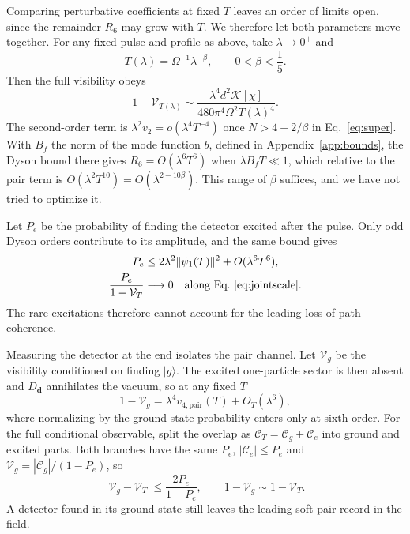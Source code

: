 \documentclass[11pt,a4paper]{article}
\newcommand{\ket}[1]{\lvert #1\rangle}
\newcommand{\cV}{\mathcal{V}}
\newcommand{\cC}{\mathcal{C}}
\newcommand{\cK}{\mathcal{K}}
\begin{document}
Comparing perturbative coefficients at fixed $T$ leaves an order of limits open, since the remainder $R_6$ may grow with $T$. We therefore let both parameters move together. For any fixed pulse and profile as above, take $\lambda\to0^+$ and
\begin{equation}
 T(\lambda)=\Omega^{-1}\lambda^{-\beta},
 \qquad 0<\beta<\frac15.\label{eq:jointscale}
\end{equation}
Then the full visibility obeys
\begin{equation}
 \boxed{\displaystyle
 1-\cV_{T(\lambda)}\sim
 \frac{\lambda^4d^2\cK[\chi]}{480\pi^4\Omega^2T(\lambda)^4}.}
 \label{eq:joint}
\end{equation}
The second-order term is $\lambda^2v_2=o(\lambda^4T^{-4})$ once $N>4+2/\beta$ in Eq.~\eqref{eq:super}. With $B_f$ the norm of the mode function $b$, defined in Appendix~\ref{app:bounds}, the Dyson bound there gives $R_6=O(\lambda^6T^6)$ when $\lambda B_fT\ll1$, which relative to the pair term is $O(\lambda^2T^{10})=O(\lambda^{2-10\beta})$. This range of $\beta$ suffices, and we have not tried to optimize it.

Let $P_e$ be the probability of finding the detector excited after the pulse. Only odd Dyson orders contribute to its amplitude, and the same bound gives
\begin{align}
 P_e&\leq 2\lambda^2\|\psi_1(T)\|^2+O(\lambda^6T^6),\nonumber\\
 \frac{P_e}{1-\cV_T}&\longrightarrow0
 \quad\text{along Eq.~\eqref{eq:jointscale}}.\label{eq:noexcitation}
\end{align}
The rare excitations therefore cannot account for the leading loss of path coherence.

Measuring the detector at the end isolates the pair channel. Let $\cV_g$ be the visibility conditioned on finding $\ket g$. The excited one-particle sector is then absent and $D_{\bm d}$ annihilates the vacuum, so at any fixed $T$
\begin{equation}
 1-\cV_g=\lambda^4v_{4,\mathrm{pair}}(T)+O_T(\lambda^6),
 \label{eq:conditional4}
\end{equation}
where normalizing by the ground-state probability enters only at sixth order. For the full conditional observable, split the overlap as $\cC_T=\cC_g+\cC_e$ into ground and excited parts. Both branches have the same $P_e$, $|\cC_e|\le P_e$ and $\cV_g=|\cC_g|/(1-P_e)$, so
\begin{equation}
 |\cV_g-\cV_T|\leq\frac{2P_e}{1-P_e},
 \qquad 1-\cV_g\sim1-\cV_T.\label{eq:conditional}
\end{equation}
A detector found in its ground state still leaves the leading soft-pair record in the field.
\end{document}
